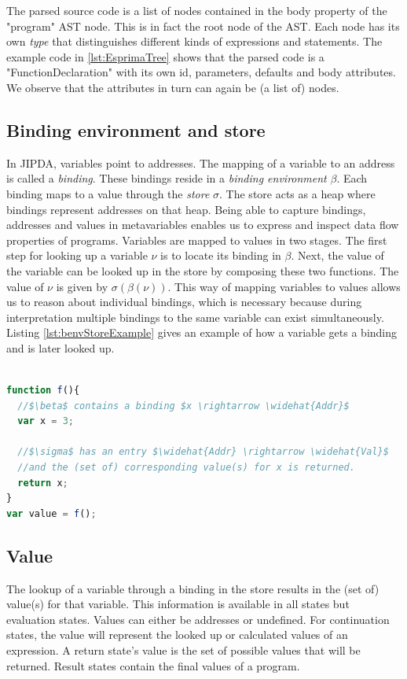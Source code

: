 The parsed source code is a list of nodes contained in the body property of the "program" AST node. This is in fact the root node of the AST. Each node has its own \textit{type} that distinguishes different kinds of expressions and statements. The example code in \ref{lst:EsprimaTree} shows that the parsed code is a "FunctionDeclaration" with its own id, parameters, defaults and body attributes. We observe that the attributes in turn can again be (a list of) nodes.

\subsection*{Binding environment and store}

In JIPDA, variables point to addresses. The mapping of a variable to an address is called a \textit{binding}. These bindings reside in a \textit{binding environment} $\beta$. Each binding maps to a value through the \textit{store} $\sigma$. The store acts as a heap where bindings represent addresses on that heap. Being able to capture bindings, addresses and values in metavariables enables us to express and inspect data flow properties of programs. Variables are mapped to values in two stages. The first step for looking up a variable $\nu$ is to locate its binding in $\beta$. Next, the value of the variable can be looked up in the store by composing these two functions. The value of $\nu$ is given by $\sigma(\beta(\nu))$. This way of mapping variables to values allows us to reason about individual bindings, which is necessary because during interpretation multiple bindings to the same variable can exist simultaneously. Listing \ref{lst:benvStoreExample} gives an example of how a variable gets a binding and is later looked up.
\\
\begin{lstlisting}[label={lst:benvStoreExample},language=JavaScript,caption=Example of the binding environment and store workings, mathescape=true]  % float=t?

function f(){
  //$\beta$ contains a binding $x \rightarrow \widehat{Addr}$
  var x = 3; 
  
  //$\sigma$ has an entry $\widehat{Addr} \rightarrow \widehat{Val}$
  //and the (set of) corresponding value(s) for x is returned. 
  return x;
}
var value = f();
\end{lstlisting}


\subsection*{Value}
The lookup of a variable through a binding in the store results in the (set of) value(s) for that variable. This information is available in all states but evaluation states. Values can either be addresses or undefined. For continuation states, the value will represent the looked up or calculated values of an expression. A return state's value is the set of possible values that will be returned. Result states contain the final values of a program.

